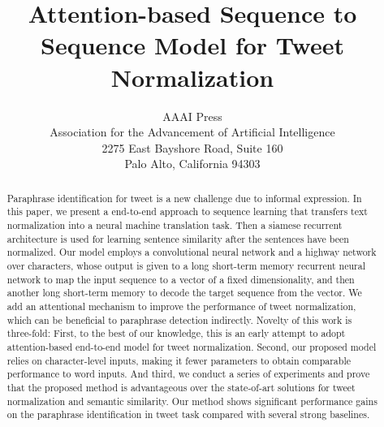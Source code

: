 \documentclass[letterpaper]{article}
\begin{document}
%
\title{Attention-based Sequence to Sequence Model for Tweet Normalization}
\author{AAAI Press\\
Association for the Advancement of Artificial Intelligence\\
2275 East Bayshore Road, Suite 160\\
Palo Alto, California 94303\\
}
\maketitle
\begin{abstract}
	Paraphrase identification for tweet is a new challenge due to informal expression. In this paper, we present a end-to-end approach to sequence learning that transfers text normalization into a neural machine translation task. Then a siamese recurrent architecture is used for learning sentence similarity after the sentences have been normalized. Our model employs a convolutional neural network and a highway network over characters, whose output is given to a long short-term memory recurrent neural network to map the input sequence to a vector of a fixed dimensionality, and then another long short-term memory to decode the target sequence from the vector. We add an attentional mechanism to improve the performance of tweet normalization, which can be beneficial to paraphrase detection indirectly. Novelty of this work is three-fold: First, to the best of our knowledge, this is an early attempt to adopt attention-based end-to-end model for tweet normalization. Second, our proposed model relies on	character-level inputs, making it fewer parameters to obtain comparable performance to word inputs. And third, we conduct a series of experiments and prove that the proposed method is advantageous over the state-of-art solutions for tweet normalization and semantic similarity. Our method shows significant performance gains on the paraphrase identification in tweet task compared with several strong baselines. 
\end{abstract}
\end{document}

